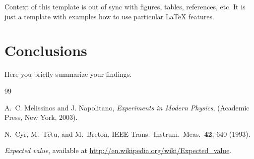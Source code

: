 \documentclass[letterpaper,12pt]{article}
\begin{document}
Context of this template is out of sync with figures, tables, references,
etc. It is just a template with examples how to use particular \LaTeX{}
features.

\section{Conclusions}
Here you briefly summarize your findings.






\begin{thebibliography}{99}


A.~C. Melissinos and J. Napolitano, \textit{Experiments in Modern Physics},
(Academic Press, New York, 2003).

N.\ Cyr, M.\ T$\hat{e}$tu, and M.\ Breton,
IEEE Trans.\ Instrum.\ Meas.\ \textbf{42}, 640 (1993).

 \emph{Expected value},  available at
\url{http://en.wikipedia.org/wiki/Expected_value}.

\end{thebibliography}
\end{document}
